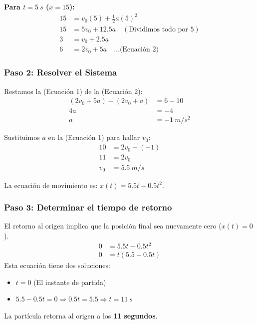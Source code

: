 \documentclass[12pt, a4paper]{article}
\begin{document}
\textbf{Para $t = \SI{5}{s}$ ($x = 15$):}
\begin{align*}
    15 &= v_0(5) + \frac{1}{2}a(5)^2 \\
    15 &= 5v_0 + 12.5a \quad (\text{Dividimos todo por 5}) \\
    3 &= v_0 + 2.5a \\
    6 &= 2v_0 + 5a \quad \dots \text{(Ecuación 2)}
\end{align*}

\subsubsection*{Paso 2: Resolver el Sistema}
Restamos la (Ecuación 1) de la (Ecuación 2):
\begin{align*}
    (2v_0 + 5a) - (2v_0 + a) &= 6 - 10 \\
    4a &= -4 \\
    a &= \SI{-1}{m/s^2}
\end{align*}

Sustituimos $a$ en la (Ecuación 1) para hallar $v_0$:
\begin{align*}
    10 &= 2v_0 + (-1) \\
    11 &= 2v_0 \\
    v_0 &= \SI{5.5}{m/s}
\end{align*}

La ecuación de movimiento es: $x(t) = 5.5t - 0.5t^2$.

\subsubsection*{Paso 3: Determinar el tiempo de retorno}
El retorno al origen implica que la posición final sea nuevamente cero ($x(t) = 0$).
\begin{align*}
    0 &= 5.5t - 0.5t^2 \\
    0 &= t(5.5 - 0.5t)
\end{align*}
Esta ecuación tiene dos soluciones:
\begin{itemize}
    \item $t = 0$ (El instante de partida)
    \item $5.5 - 0.5t = 0 \Rightarrow 0.5t = 5.5 \Rightarrow t = \SI{11}{s}$
\end{itemize}

\begin{tcolorbox}[colback=blue!5!white, colframe=blue!75!black, title=Respuesta Final]
    La partícula retorna al origen a los \textbf{11 segundos}.
\end{tcolorbox}
\end{document}
